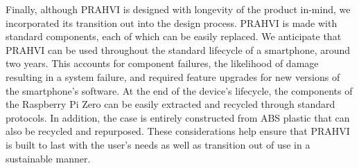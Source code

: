 	Finally, although PRAHVI is designed with longevity of the product in-mind, we incorporated its transition out into the design process. PRAHVI is made with standard components, each of which can be easily replaced. We anticipate that PRAHVI can be used throughout the standard lifecycle of a smartphone, around two years. This accounts for component failures, the likelihood of damage resulting in a system failure, and required feature upgrades for new versions of the smartphone’s software. At the end of the device’s lifecycle, the components of the Raspberry Pi Zero can be easily extracted and recycled through standard protocols. In addition, the case is entirely constructed from ABS plastic that can also be recycled and repurposed. These considerations help ensure that PRAHVI is built to last with the user’s needs as well as transition out of use in a sustainable manner.

